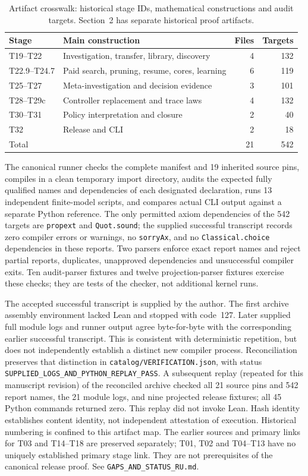 \documentclass[10pt,letterpaper]{article}
\newcommand{\rc}[1]{\texttt{#1}}
\begin{document}
\begin{table}[htbp]
\centering\small
\caption{Artifact crosswalk: historical stage IDs, mathematical constructions and audit targets. Section~2 has separate historical proof artifacts.}\label{tab:formal-audit}
\begin{tabularx}{\linewidth}{@{}lXrr@{}}\toprule
Stage & Main construction & Files & Targets\\\midrule
T19--T22 & Investigation, transfer, library, discovery & 4 & 132\\
T22.9--T24.7 & Paid search, pruning, resume, cores, learning & 6 & 119\\
T25--T27 & Meta-investigation and decision evidence & 3 & 101\\
T28--T29c & Controller replacement and trace laws & 4 & 132\\
T30--T31 & Policy interpretation and closure & 2 & 40\\
T32 & Release and CLI & 2 & 18\\\midrule
Total & & 21 & 542\\\bottomrule
\end{tabularx}
\end{table}

The canonical runner checks the complete manifest and 19 inherited source pins, compiles in a clean temporary import directory, audits the expected fully qualified names and dependencies of each designated declaration, runs 13 independent finite-model scripts, and compares actual CLI output against a separate Python reference. The only permitted axiom dependencies of the 542 targets are \rc{propext} and \rc{Quot.sound}; the supplied successful transcript records zero compiler errors or warnings, no \rc{sorryAx}, and no \rc{Classical.choice} dependencies in these reports. Two parsers enforce exact report names and reject partial reports, duplicates, unapproved dependencies and unsuccessful compiler exits. Ten audit-parser fixtures and twelve projection-parser fixtures exercise these checks; they are tests of the checker, not additional kernel runs.

The accepted successful transcript is supplied by the author. The first archive assembly environment lacked Lean and stopped with code~127. Later supplied full module logs and runner output agree byte-for-byte with the corresponding earlier successful transcript. This is consistent with deterministic repetition, but does not independently establish a distinct new compiler process. Reconciliation preserves that distinction in \rc{catalog/VERIFICATION.json}, with status \rc{SUPPLIED\_LOGS\_AND\_PYTHON\_REPLAY\_PASS}. A subsequent replay (repeated for this manuscript revision) of the reconciled archive checked all 21 source pins and 542 report names, the 21 module logs, and nine projected release fixtures; all 45 Python commands returned zero. This replay did not invoke Lean. Hash identity establishes content identity, not independent attestation of execution. Historical numbering is confined to this artifact map. The earlier sources and primary links for T03 and T14--T18 are preserved separately; T01, T02 and T04--T13 have no uniquely established primary stage link. They are not prerequisites of the canonical release proof. See \rc{GAPS\_AND\_STATUS\_RU.md}.
\end{document}
